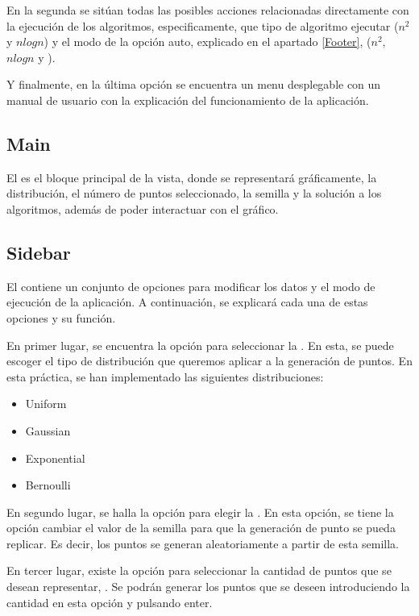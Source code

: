 En la segunda se sitúan todas las posibles acciones relacionadas directamente con la ejecución de los algoritmos, especificamente, que tipo de algoritmo ejecutar ($n^2$ y $nlogn$) y el modo de la opción auto, explicado en el apartado \ref{Footer}, ($n^2$, $nlogn$ y ).\bigskip

Y finalmente, en la última opción se encuentra un menu desplegable con un manual de usuario con la explicación del funcionamiento de la aplicación.

\subsection{Main}

El  es el bloque principal de la vista, donde se representará gráficamente, la distribución, el número de puntos seleccionado, la semilla y la solución a los algoritmos, además de poder interactuar con el gráfico.\bigskip

\subsection{Sidebar}\label{Sidebar}

El  contiene un conjunto de opciones para modificar los datos y el modo de ejecución de la aplicación. A continuación, se explicará cada una de estas opciones y su función.\bigskip

En primer lugar, se encuentra la opción para seleccionar la . En esta, se puede escoger el tipo de distribución que queremos aplicar a la generación de puntos. En esta práctica, se han implementado las siguientes distribuciones: 
\begin{itemize}
    \item Uniform
    \item Gaussian
    \item Exponential
    \item Bernoulli
\end{itemize}
\bigskip

En segundo lugar, se halla la opción para elegir la . En esta opción, se tiene la opción cambiar el valor de la semilla para que la generación de punto se pueda replicar. Es decir, los puntos se generan aleatoriamente a partir de esta semilla.\bigskip

En tercer lugar, existe la opción para seleccionar la cantidad de puntos que se desean representar, . Se podrán generar los puntos que se deseen introduciendo la cantidad en esta opción y pulsando enter. \bigskip

